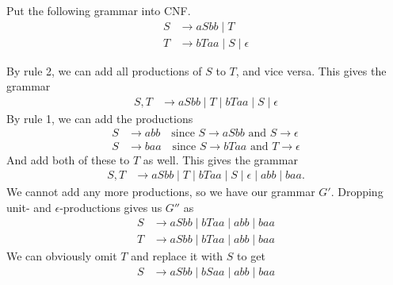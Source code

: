 \begin{exercise}
    Put the following grammar into CNF.
    \begin{align*}
        S &\to aSbb \mid T \\
        T &\to bTaa \mid S \mid \epsilon
    \end{align*}
\end{exercise}
\begin{solution}
    By rule 2, we can add all productions of $S$ to $T$, and vice versa.
    This gives the grammar \begin{align*}
        S, T &\to aSbb \mid T \mid bTaa \mid S \mid \epsilon
    \end{align*}
    By rule 1, we can add the productions \begin{align*}
        S &\to abb \quad
        \text{since } S \to aSbb \text{ and } S \to \epsilon \\
        S &\to baa \quad
        \text{since } S \to bTaa \text{ and } T \to \epsilon
    \end{align*}
    And add both of these to $T$ as well.
    This gives the grammar \begin{align*}
        S, T &\to aSbb \mid T \mid bTaa \mid S \mid \epsilon \mid
        abb \mid baa.
    \end{align*}
    We cannot add any more productions, so we have our grammar $G'$.
    Dropping unit- and $\epsilon$-productions gives us $G''$ as
    \begin{align*}
        S &\to aSbb \mid bTaa \mid abb \mid baa \\
        T &\to aSbb \mid bTaa \mid abb \mid baa
    \end{align*}
    We can obviously omit $T$ and replace it with $S$ to get \begin{align*}
        S &\to aSbb \mid bSaa \mid abb \mid baa
    \end{align*}
\end{solution}

